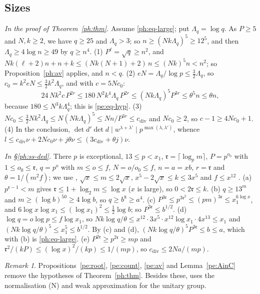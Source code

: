 \documentclass[10pt]{amsart}
\theoremstyle{definition}
\theoremstyle{remark}
\newtheorem{remark}[theorem]{Remark}
\providecommand{\phcd}{c_{\mathrm{div}}}
\begin{document}
\subsection{Sizes}\label{pe:ss-sizes}
\emph{In the proof of Theorem~\ref{ph:thm}.} Assume \eqref{ph:eq-large}; put $\Lambda_q=\log q$.
As $P\ge5$ and $N,k\ge2$, we have $q\ge25$ and $\Lambda_q>3$; so $n\ge(Nk\Lambda_q)^5\ge12^5$,
and then $\Lambda_q\ge4\log n\ge49$ by $q\ge n^4$.
(1) $P^\ell=\sqrt q\ge n^2$, and $Nk(\ell+2)n+n+k\le(Nk(N+1)+2)\,n\le(Nk)^5n<n^2$; so
Proposition~\ref{ph:av} applies, and $n<q$. (2) $eN=\Lambda_q/\log p\le\tfrac32\Lambda_q$, so
$c_0=k^2eN\le\tfrac32k^2\Lambda_q$, and with $c=5Nc_0$:
\[
24\,Nk^2c\,P^{2r}\le180\,N^2k^4\Lambda_q\,P^{2r}\le(Nk\Lambda_q)^5P^{3r}\le\theta^5n\le\theta n,
\]
because $180\le N^3k\Lambda_q^4$; this is \eqref{pe:eq-hyp}. (3) $Nc_0\le\tfrac32Nk^2\Lambda_q\le
N(Nk\Lambda_q)^5\le Nn/P^{3r}\le\phcd$ and $Nc_0\ge2$, so $c-1\ge4Nc_0+1$. (4) In the conclusion,
$\det d'\det d\mid w^{\lambda+\lambda'}\mid p^{\max(\lambda,\lambda')}$, whence $l\le\phcd\nu+2Nc_0
\nu+j\theta\nu\le(3\phcd+\theta j)\nu$.

\emph{In \S\ref{ph:ss-ded}.} There $p$ is exceptional, $13\le p<x_1$, $\mathfrak r=\lceil\log_p
m\rceil$, $P=p^{o_0}$ with $1\le o_0\le\mathfrak r$, $q=p^o$ with $m\le o\le f$, $N=o/o_0\le f$,
$n=a=xb$, $r=\mathfrak r$ and $\theta=1/(m^2f)$; we use {\cite[(36)]{P46}}, $\sqrt x\le m\le
2\sqrt x$, $x^5-2\sqrt x\le k\le3x^5$ and $f\le x^{12}$ {\cite[(38)]{P46}}. (a) $p^{\mathfrak r-1}<m$ gives
$\mathfrak r\le1+\log_2m\le\log x$ ($x$ is large), so $0<2\mathfrak r\le k$. (b) $q\ge13^m$ and $m\ge(\log
b)^{50}\ge4\log b$, so $q\ge b^{8}\ge a^4$. (c) $P^{3\mathfrak r}\le p^{3\mathfrak r^2}\le(pm)^{3
\mathfrak r}\le x_1^{6\log x}$, and $6\log x\log x_1\le(\log x_1)^2\le\tfrac12\log b$; so
$P^{3\mathfrak r}\le b^{1/2}$. (d) $\log q=o\log p\le f\log x_1$, so $Nk\log q/\theta\le x^{12}
\cdot3x^5\cdot x^{12}\log x_1\cdot4x^{13}\le x_1$ and $(Nk\log q/\theta)^5\le x_1^5\le b^{1/2}$.
By (c) and (d), $(Nk\log q/\theta)^5P^{3\mathfrak r}\le b\le a$, which with (b) is
\eqref{ph:eq-large}. (e) $P^{2\mathfrak r}\ge p^{2\mathfrak r}\ge mp$ and $\mathfrak r^2/(kP)\le
(\log x)^2/(kp)\le1/(mp)$, so $\phcd\le2Na/(mp)$.

\begin{remark}\label{pe:status}
Propositions~\ref{pe:root}, \ref{pe:count}, \ref{pe:av} and Lemma~\ref{pe:AinC} remove the
hypotheses of Theorem~\ref{ph:thm}. Besides these, {\cite[Lemma~4.19]{P49}} uses the normalisation
{\rm(N)} and weak approximation for the unitary group.
\end{remark}
\end{document}
